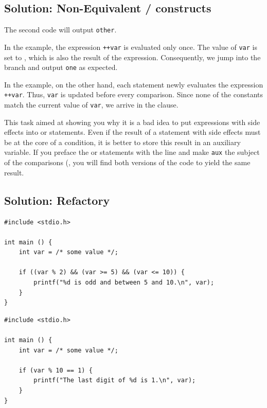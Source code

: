 \subsection*{Solution: Non-Equivalent / constructs}
The second code will output \texttt{other}. 

In the  example, the expression \texttt{++var} is evaluated only once. The value of \texttt{var} is set to , which is also the result of the expression. Consequently, we jump into the branch  and output \texttt{one} as expected.

In the  example, on the other hand, each  statement newly evaluates the expression \texttt{++var}. Thus, \texttt{var} is updated before every comparison. Since none of the constants match the current value of \texttt{var}, we arrive in the  clause.

This task aimed at showing you why it is a bad idea to put expressions with side effects into  or  statements. Even if the result of a statement with side effects must be at the core of a condition, it is better to store this result in an auxiliary variable. If you preface the  or  statements with the line  and make \texttt{aux} the subject of the comparisons (, you will find both versions of the code to yield the same result.


\subsection*{Solution: Refactory}
\begin{codebox}[exo5-6.c]
\begin{verbatim}
#include <stdio.h>

int main () {
    int var = /* some value */;

    if ((var % 2) && (var >= 5) && (var <= 10)) {
        printf("%d is odd and between 5 and 10.\n", var);
    }
}
\end{verbatim}
\end{codebox}

\begin{codebox}
\begin{verbatim}
#include <stdio.h>

int main () {
    int var = /* some value */;

    if (var % 10 == 1) {
        printf("The last digit of %d is 1.\n", var);
    }
}
\end{verbatim}
\end{codebox}